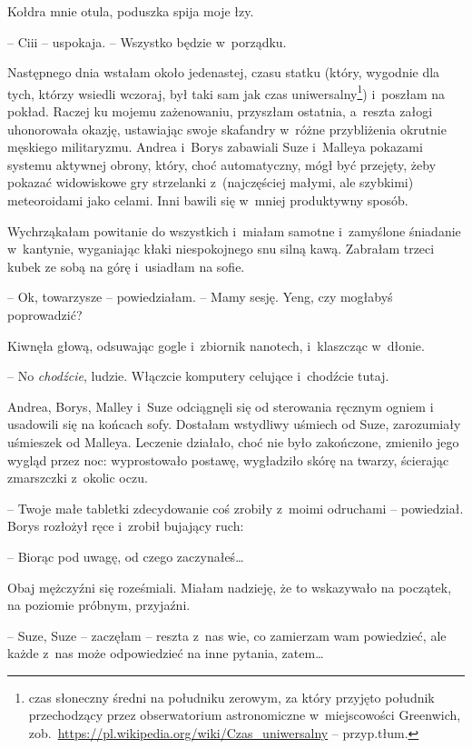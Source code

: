 \documentclass[oneside,polish,11pt,sfheadings]{mwbk}
\begin{document}
Kołdra mnie otula, poduszka spija moje łzy.

-- Ciii -- uspokaja. -- Wszystko będzie w~porządku.

Następnego dnia wstałam około jedenastej, czasu statku (który, wygodnie
dla tych, którzy wsiedli wczoraj, był taki sam jak czas uniwersalny\footnote{
czas słoneczny średni na południku zerowym, za który przyjęto południk
przechodzący przez obserwatorium astronomiczne w~miejscowości Greenwich,
zob.~\url{https://pl.wikipedia.org/wiki/Czas\_uniwersalny} -- przyp.tłum.}) i~poszłam na pokład. Raczej ku mojemu zażenowaniu,
przyszłam ostatnia, a~reszta załogi uhonorowała okazję, ustawiając swoje
skafandry w~różne przybliżenia okrutnie męskiego militaryzmu. Andrea i~Borys zabawiali Suze i~Malleya pokazami systemu aktywnej obrony, który,
choć automatyczny, mógł być przejęty, żeby pokazać widowiskowe gry
strzelanki z~(najczęściej małymi, ale szybkimi) meteoroidami jako
celami. Inni bawili się w~mniej produktywny sposób.

Wychrząkałam powitanie do wszystkich i~miałam samotne i~zamyślone
śniadanie w~kantynie, wyganiając kłaki niespokojnego snu silną kawą.
Zabrałam trzeci kubek ze sobą na górę i~usiadłam na sofie.

-- Ok, towarzysze -- powiedziałam. -- Mamy sesję. Yeng, czy mogłabyś
poprowadzić?

Kiwnęła głową, odsuwając gogle i~zbiornik nanotech, i~klaszcząc w~dłonie. 

-- No \textit{chodźcie}, ludzie. Włączcie komputery celujące i~chodźcie tutaj.

Andrea, Borys, Malley i~Suze odciągnęli się od sterowania ręcznym ogniem
i usadowili się na końcach sofy. Dostałam wstydliwy uśmiech od Suze,
zarozumiały uśmieszek od Malleya. Leczenie działało, choć nie było
zakończone, zmieniło jego wygląd przez noc: wyprostowało postawę,
wygładziło skórę na twarzy, ścierając zmarszczki z~okolic oczu.

-- Twoje małe tabletki zdecydowanie coś zrobiły z~moimi odruchami -- powiedział. Borys rozłożył ręce i~zrobił bujający ruch: 

-- Biorąc pod
uwagę, od czego zaczynałeś\ldots  

Obaj mężczyźni się roześmiali. Miałam
nadzieję, że to wskazywało na początek, na poziomie próbnym, przyjaźni.

-- Suze, Suze -- zaczęłam -- reszta z~nas wie, co zamierzam wam powiedzieć,
ale każde z~nas może odpowiedzieć na inne pytania, zatem\ldots 
\end{document}
